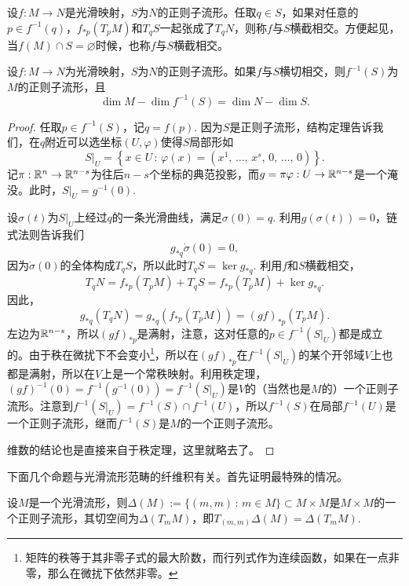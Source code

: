 \begin{para}[横截相交]
设$f:M\to N$是光滑映射，$S$为$N$的正则子流形。任取$q\in S$，如果对任意的$p\in f^{-1}(q)$，$f_{*p}(T_pM)$和$T_qS$一起张成了$T_q N$，则称$f$与$S$横截相交。方便起见，当$f(M)\cap S=\varnothing$时候，也称$f$与$S$横截相交。
\end{para}

\begin{thm}\label{thm:2.17}
设$f:M\to N$为光滑映射，$S$为$N$的正则子流形。如果$f$与$S$横切相交，则$f^{-1}(S)$为$M$的正则子流形，且
\[
	\dim M-\dim f^{-1}(S)=\dim N-\dim S.
\]
\end{thm}

\begin{proof}
任取$p\in f^{-1}(S)$，记$q=f(p)$. 因为$S$是正则子流形，结构定理告诉我们，在$q$附近可以选坐标$(U,\varphi)$使得$S$局部形如
\[
	S|_U=\left\{x\in U\,:\, \varphi(x)=\left(x^1\text{, $\dots$, }x^s\text{, }0\text{, $\dots$, }0\right)\right\}.
\]
记$\pi:\mathbb{R}^n\to \mathbb{R}^{n-s}$为往后$n-s$个坐标的典范投影，而$g=\pi\varphi:U\to \mathbb{R}^{n-s}$是一个淹没。此时，$S|_U=g^{-1}(0)$. 

设$\sigma(t)$为$S|_U$上经过$q$的一条光滑曲线，满足$\sigma(0)=q$. 利用$g(\sigma(t))=0$，链式法则告诉我们
\[
	g_{*q}\dot\sigma(0)=0,
\]
因为$\dot\sigma(0)$的全体构成$T_qS$，所以此时$T_qS=\ker g_{*q}$. 利用$f$和$S$横截相交，
\[
	T_q N=f_{*p}(T_pM)+T_qS=f_{*p}(T_pM)+\ker g_{*q}.
\]
因此，
\[
	g_{*q}(T_q N)=g_{*q}\left(f_{*p}(T_pM)\right)=(gf)_{*p}(T_pM).
\]
左边为$\mathbb{R}^{n-s}$，所以$(gf)_{*p}$是满射，注意，这对任意的$p\in f^{-1}(S|_U)$都是成立的。由于秩在微扰下不会变小\footnote{矩阵的秩等于其非零子式的最大阶数，而行列式作为连续函数，如果在一点非零，那么在微扰下依然非零。}，所以在$(gf)_{*p}$在$f^{-1}(S|_U)$的某个开邻域$V$上也都是满射，所以在$V$上是一个常秩映射。利用秩定理，$(gf)^{-1}(0)=f^{-1}(g^{-1}(0))=f^{-1}(S|_U)$是$V$的（当然也是$M$的）一个正则子流形。注意到$f^{-1}(S|_U)=f^{-1}(S)\cap f^{-1}(U)$，所以$f^{-1}(S)$在局部$f^{-1}(U)$是一个正则子流形，继而$f^{-1}(S)$是$M$的一个正则子流形。

维数的结论也是直接来自于秩定理，这里就略去了。
\end{proof}

下面几个命题与光滑流形范畴的纤维积有关。首先证明最特殊的情况。

\begin{lem}
设$M$是一个光滑流形，则$\Delta(M):=\{(m,m)\,:\,m\in M\}\subset M\times M$是$M\times M$的一个正则子流形，其切空间为$\Delta(T_mM)$，即$T_{(m,m)}\Delta(M)=\Delta(T_mM)$.
\end{lem}

